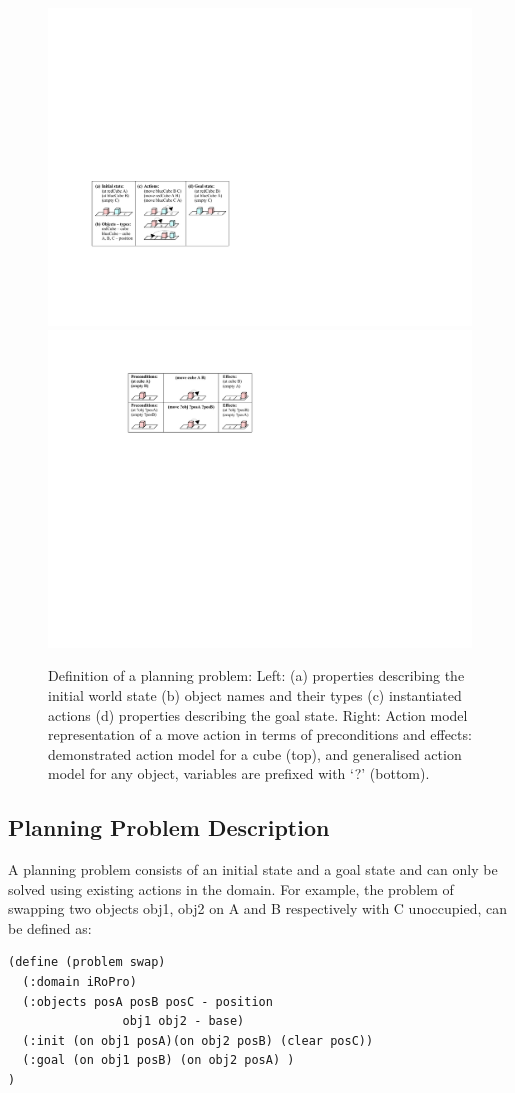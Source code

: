 \begin{figure}[!h]
	\centering
	\includegraphics[width=0.48\linewidth]{figures/planning-permutation}
	\includegraphics[width=0.48\linewidth]{figures/schema-logic}
	\caption{Definition of a planning problem: Left: (a) properties describing the initial world state (b) object names and their types (c) instantiated actions (d) properties describing the goal state. Right: Action model representation of a move action in terms of preconditions and effects: demonstrated action model for a cube (top), and generalised action model for any object, variables are prefixed with `?' (bottom).}
	\label{fig:action}
\end{figure}
\subsection{Planning Problem Description}\label{subsec:PPDescription}
A planning problem consists of an initial state and a goal state and can only be solved using existing actions in the domain.
For example, the problem of swapping two objects obj1, obj2 on A and B respectively with C unoccupied, can be defined as:

\begin{verbatim}
(define (problem swap)
  (:domain iRoPro)
  (:objects posA posB posC - position
                obj1 obj2 - base)
  (:init (on obj1 posA)(on obj2 posB) (clear posC))
  (:goal (on obj1 posB) (on obj2 posA) )
)
\end{verbatim}

